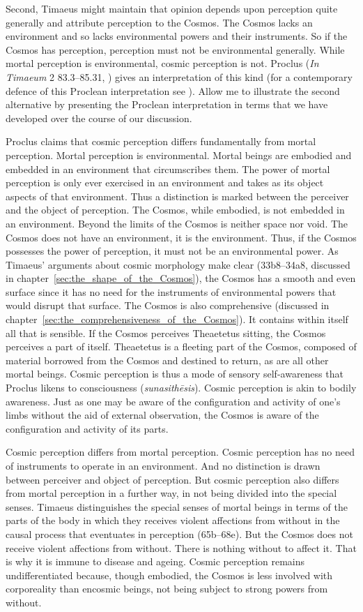 Second, Timaeus might maintain that opinion depends upon perception quite generally and attribute perception to the Cosmos. The Cosmos lacks an environment and so lacks environmental powers and their instruments. So if the Cosmos has perception, perception must not be environmental generally. While mortal perception is environmental, cosmic perception is not. Proclus (\emph{In Timaeum} 2 83.3–85.31, \citealt{Diehl:1903re}) gives an interpretation of this kind (for a contemporary defence of this Proclean interpretation see \citealt{Reydams-Schils:1997aa}). Allow me to illustrate the second alternative by presenting the Proclean interpretation in terms that we have developed over the course of our discussion.

Proclus claims that cosmic perception differs fundamentally from mortal perception. Mortal perception is environmental. Mortal beings are embodied and embedded in an environment that circumscribes them. The power of mortal perception is only ever exercised in an environment and takes as its object aspects of that environment. Thus a distinction is marked between the perceiver and the object of perception. The Cosmos, while embodied, is not embedded in an environment. Beyond the limits of the Cosmos is neither space nor void. The Cosmos does not have an environment, it is the environment. Thus, if the Cosmos possesses the power of perception, it must not be an environmental power. As Timaeus' arguments about cosmic morphology make clear (33b8–34a8, discussed in chapter~\ref{sec:the_shape_of_the_Cosmos}), the Cosmos has a smooth and even surface since it has no need for the instruments of environmental powers that would disrupt that surface. The Cosmos is also comprehensive (discussed in chapter~\ref{sec:the_comprehensiveness_of_the_Cosmos}). It contains within itself all that is sensible. If the Cosmos perceives Theaetetus sitting, the Cosmos perceives a part of itself. Theaetetus is a fleeting part of the Cosmos, composed of material borrowed from the Cosmos and destined to return, as are all other mortal beings. Cosmic perception is thus a mode of sensory self-awareness that Proclus likens to consciousness (\emph{sunasithēsis}). Cosmic perception is akin to bodily awareness. Just as one may be aware of the configuration and activity of one's limbs without the aid of external observation, the Cosmos is aware of the configuration and activity of its parts. 

Cosmic perception differs from mortal perception. Cosmic perception has no need of instruments to operate in an environment. And no distinction is drawn between perceiver and object of perception. But cosmic perception also differs from mortal perception in a further way, in not being divided into the special senses. Timaeus distinguishes the special senses of mortal beings in terms of the parts of the body in which they receives violent affections from without in the causal process that eventuates in perception (65b–68e). But the Cosmos does not receive violent affections from without. There is nothing without to affect it. That is why it is immune to disease and ageing. Cosmic perception remains undifferentiated because, though embodied, the Cosmos is less involved with corporeality than encosmic beings, not being subject to strong powers from without. 

